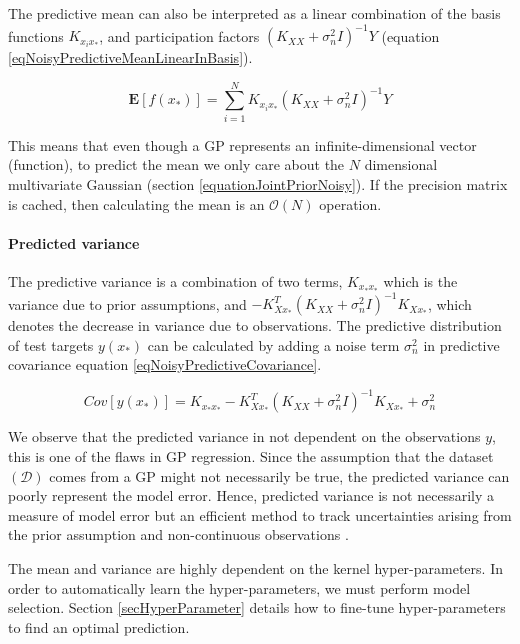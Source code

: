 The predictive mean can also be interpreted as a linear combination of the basis functions $K_{x_{i}x_{*}}$, and participation factors $( K_{XX} + \sigma^{2}_{n}I)^{-1}Y$ (equation \ref{eqNoisyPredictiveMeanLinearInBasis}). 

  \begin{equation}\label{eqNoisyPredictiveMeanLinearInBasis}
  \mathbf{E}[f(x_{*})] = \sum_{i = 1}^{N} K_{x_{i}x_{*}}( K_{XX} + \sigma^{2}_{n}I)^{-1}Y
  \end{equation}
  
This means that even though a GP represents an infinite-dimensional vector (function), to predict the mean we only care about the $N$ dimensional multivariate Gaussian (section \ref{equationJointPriorNoisy}). If the precision matrix is cached, then calculating the mean is an $\mathcal{O}\left ( N \right )$ operation.

\paragraph{Predicted variance}
The predictive variance is a combination of two terms, $K_{x_{*}x_{*}}$ which is the variance due to prior assumptions, and $- K_{Xx_{*}}^{T}( K_{XX} + \sigma^{2}_{n}I )^{-1} K_{Xx_{*}}$, which denotes the decrease in variance due to observations. The predictive distribution of test targets $y(x_{*})$ can be calculated by adding a noise term $\sigma^{2}_{n}$ in predictive covariance equation \ref{eqNoisyPredictiveCovariance}. 

  \begin{equation}\label{eqNoisyPredictiveCovarianceOnNoisyTarget}
	Cov[y(x_{*})] = K_{x_{*}x_{*}} - K_{Xx_{*}}^{T}( K_{XX} + \sigma^{2}_{n}I )^{-1} K_{Xx_{*}} + \sigma_{n}^{2}
  \end{equation}
  
We observe that the predicted variance in not dependent on the observations $y$, this is one of the flaws in GP regression. Since the assumption that the dataset $(\mathcal{D})$ comes from a GP might not necessarily be true, the predicted variance can poorly represent the model error. Hence, predicted variance is not necessarily a measure of model error but an efficient method to track uncertainties arising from the prior assumption and non-continuous observations \cite{shah2014student}.

The mean and variance are highly dependent on the kernel hyper-parameters. In order to automatically learn the hyper-parameters, we must perform model selection. Section \ref{secHyperParameter} details how to fine-tune hyper-parameters to find an optimal prediction.

